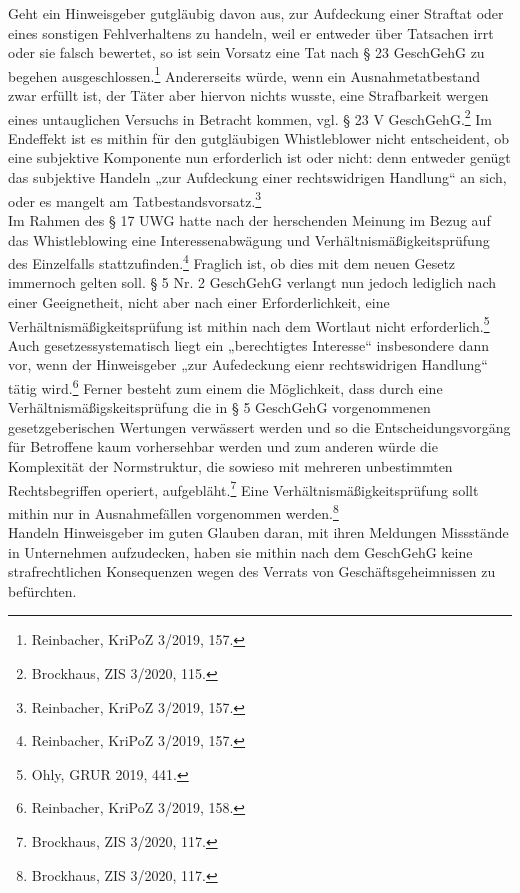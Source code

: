 Geht ein Hinweisgeber gutgläubig davon aus, zur Aufdeckung einer Straftat oder eines sonstigen Fehlverhaltens zu handeln, weil er entweder über Tatsachen irrt oder sie falsch bewertet, so ist sein Vorsatz eine Tat nach § 23 GeschGehG zu begehen ausgeschlossen.\footnote{Reinbacher, KriPoZ 3/2019, 157.}
Andererseits würde, wenn ein Ausnahmetatbestand zwar erfüllt ist, der Täter aber hiervon nichts wusste, eine Strafbarkeit wergen eines untauglichen Versuchs in Betracht kommen, vgl. § 23 V GeschGehG.\footnote{Brockhaus, ZIS 3/2020, 115.}
Im Endeffekt ist es mithin für den gutgläubigen Whistleblower nicht entscheident, ob eine subjektive Komponente nun erforderlich ist oder nicht: denn entweder genügt das subjektive Handeln „zur Aufdeckung einer rechtswidrigen Handlung“ an sich, oder es mangelt am Tatbestandsvorsatz.\footnote{Reinbacher, KriPoZ 3/2019, 157.}\\
Im Rahmen des § 17 UWG hatte nach der herschenden Meinung im Bezug auf das Whistleblowing eine Interessenabwägung und Verhältnismäßigkeitsprüfung des Einzelfalls stattzufinden.\footnote{Reinbacher, KriPoZ 3/2019, 157.}
Fraglich ist, ob dies mit dem neuen Gesetz immernoch gelten soll.
§ 5 Nr. 2 GeschGehG verlangt nun jedoch lediglich nach einer Geeignetheit, nicht aber nach einer Erforderlichkeit, eine Verhältnismäßigkeitsprüfung ist mithin nach dem Wortlaut nicht erforderlich.\footnote{Ohly, GRUR 2019, 441.}
Auch gesetzessystematisch liegt ein „berechtigtes Interesse“ insbesondere dann vor, wenn der Hinweisgeber „zur Aufedeckung eienr rechtswidrigen Handlung“ tätig wird.\footnote{Reinbacher, KriPoZ 3/2019, 158.}
Ferner besteht zum einem die Möglichkeit, dass durch eine Verhältnismäßigskeitsprüfung die in § 5 GeschGehG vorgenommenen gesetzgeberischen Wertungen verwässert werden und so die Entscheidungsvorgäng für Betroffene kaum vorhersehbar werden und zum anderen würde die Komplexität der Normstruktur, die sowieso mit mehreren unbestimmten Rechtsbegriffen operiert, aufgebläht.\footnote{Brockhaus, ZIS 3/2020, 117.}
Eine Verhältnismäßigkeitsprüfung sollt mithin nur in Ausnahmefällen vorgenommen werden.\footnote{Brockhaus, ZIS 3/2020, 117.}\\
Handeln Hinweisgeber im guten Glauben daran, mit ihren Meldungen Missstände in Unternehmen aufzudecken, haben sie mithin nach dem GeschGehG keine strafrechtlichen Konsequenzen wegen des Verrats von Geschäftsgeheimnissen zu befürchten.